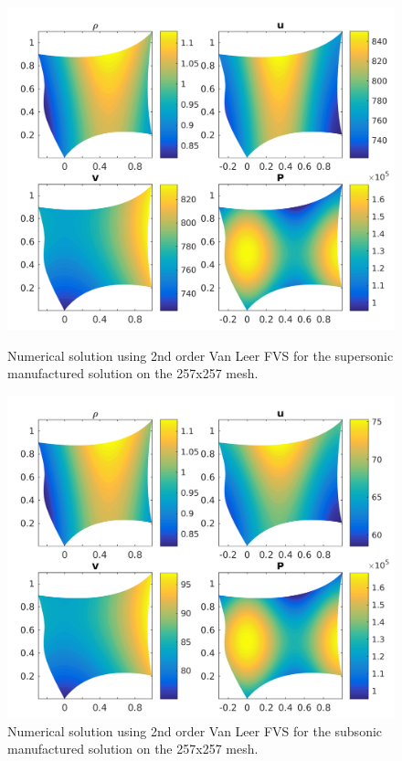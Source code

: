 \documentclass[]{aiaa-tc}%
\begin{document}
\begin{figure}[!htb]
  \centering
  \includegraphics[width=\linewidth]{figures/MMS_mesh6_SS_soln}
  \caption{Numerical solution using 2nd order Van Leer FVS for the supersonic manufactured solution on the 257x257 mesh.}
  \label{fig:SS}
  \endminipage\hfill
  \centering
  \includegraphics[width=\linewidth]{figures/MMS_mesh6_SB_soln}
  \caption{Numerical solution using 2nd order Van Leer FVS for the subsonic manufactured solution on the 257x257 mesh.}
\label{fig:SB}
  \endminipage\hfill
\end{figure}
\end{document}
